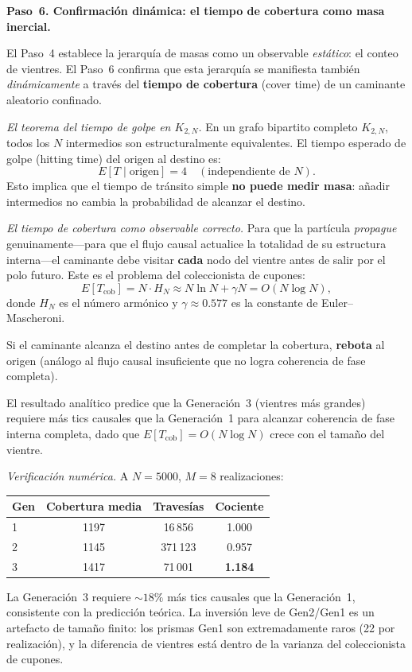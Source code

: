 \documentclass[11pt, a4paper, openany]{book}
\begin{document}
\bigskip
\noindent
\textbf{Paso~6. Confirmaci\'on din\'amica: el tiempo de cobertura
como masa inercial.}

El Paso~4 establece la jerarqu\'ia de masas como un observable
\emph{est\'atico}: el conteo de vientres. El Paso~6 confirma que esta
jerarqu\'ia se manifiesta tambi\'en \emph{din\'amicamente} a trav\'es
del \textbf{tiempo de cobertura} (cover time) de un caminante aleatorio
confinado.

\medskip
\noindent\textit{El teorema del tiempo de golpe en $K_{2,N}$.}\enspace
En un grafo bipartito completo $K_{2,N}$, todos los $N$ intermedios
son estructuralmente equivalentes. El tiempo esperado de golpe
(hitting time) del origen al destino es:
\[
  E[T \mid \text{origen}] = 4 \quad (\text{independiente de } N).
\]
Esto implica que el tiempo de tr\'ansito simple
\textbf{no puede medir masa}: a\~nadir intermedios no cambia
la probabilidad de alcanzar el destino.

\medskip
\noindent\textit{El tiempo de cobertura como observable correcto.}\enspace
Para que la part\'icula \emph{propague} genuinamente---para que el
flujo causal actualice la totalidad de su estructura interna---el
caminante debe visitar \textbf{cada} nodo del vientre antes de salir
por el polo futuro. Este es el problema del coleccionista de cupones:
\[
  E[T_{\text{cob}}] = N \cdot H_N
  \approx N \ln N + \gamma N
  = O(N \log N),
\]
donde $H_N$ es el n\'umero arm\'onico y $\gamma \approx 0{.}577$ es la
constante de Euler--Mascheroni.

Si el caminante alcanza el destino antes de completar la cobertura,
\textbf{rebota} al origen (an\'alogo al flujo causal insuficiente que
no logra coherencia de fase completa).

\medskip
\noindent
El resultado anal\'itico predice que la Generaci\'on~3 (vientres m\'as
grandes) requiere m\'as tics causales que la Generaci\'on~1 para
alcanzar coherencia de fase interna completa, dado que
$E[T_{\mathrm{cob}}] = O(N \log N)$ crece con el tama\~no del vientre.

\medskip
\noindent\textit{Verificaci\'on num\'erica.}\enspace
A $N = 5000$, $M = 8$ realizaciones:
\begin{center}
\renewcommand{\arraystretch}{1.3}
\begin{tabular}{lccc}
\toprule
\textbf{Gen} & \textbf{Cobertura media} & \textbf{Traves\'ias}
  & \textbf{Cociente} \\
\midrule
1 & 1197 & 16\,856  & 1.000 \\
2 & 1145 & 371\,123 & 0.957 \\
3 & 1417 & 71\,001  & \textbf{1.184} \\
\bottomrule
\end{tabular}
\end{center}
La Generaci\'on~3 requiere ${\sim}18\%$ m\'as tics causales que la
Generaci\'on~1, consistente con la predicci\'on te\'orica.
La inversi\'on leve de Gen2/Gen1 es un artefacto de tama\~no finito:
los prismas Gen1 son extremadamente raros (22 por realizaci\'on),
y la diferencia de vientres est\'a dentro de la varianza del
coleccionista de cupones.
\end{document}
